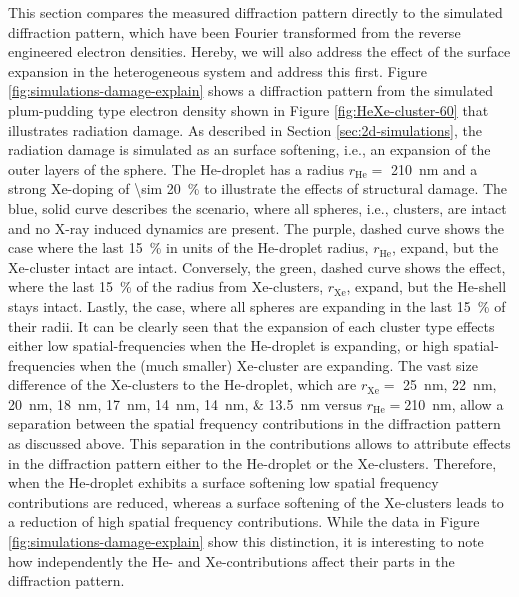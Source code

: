 This section compares the measured diffraction pattern directly to the simulated diffraction pattern, which have been Fourier transformed from the reverse engineered electron densities. Hereby, we will also address the effect of the surface expansion in the heterogeneous system and address this first. Figure \ref{fig:simulations-damage-explain} shows a diffraction pattern from the simulated plum-pudding type electron density shown in Figure \ref{fig:HeXe-cluster-60} that illustrates radiation damage. As described in Section \ref{sec:2d-simulations}, the radiation damage is simulated as an surface softening, i.e., an expansion of the outer layers of the sphere. The He-droplet has a radius $r_{\text{He}}=$ \SI{210}{\nano\meter} and a strong Xe-doping of \SI{\sim 20}{\percent} to illustrate the effects of structural damage. The blue, solid curve describes the scenario, where all spheres, i.e., clusters, are intact and no X-ray induced dynamics are present. The purple, dashed curve shows the case where the last \SI{15}{\percent} in units of the He-droplet radius, $r_{\text{He}}$, expand, but the Xe-cluster intact are intact. Conversely, the green, dashed curve shows the effect, where the last \SI{15}{\percent} of the radius from Xe-clusters, $r_{\text{Xe}}$, expand, but the He-shell stays intact. Lastly, the case, where all spheres are expanding in the last \SI{15}{\percent} of their radii. It can be clearly seen that the expansion of each cluster type effects either low spatial-frequencies when the He-droplet is expanding, or high spatial-frequencies when the (much smaller) Xe-cluster are expanding. The vast size difference of the Xe-clusters to the He-droplet, which are $r_{\text{Xe}}=$ \SIlist{25;22;20;18;17;14;14;13.5}{\nano\meter} versus $r_{\text{He}}=$\SI{210}{\nano\meter}, allow a separation between the spatial frequency contributions in the diffraction pattern as discussed above. This separation in the contributions allows to attribute effects in the diffraction pattern either to the He-droplet or the Xe-clusters. Therefore, when the He-droplet exhibits a surface softening low spatial frequency contributions are reduced, whereas a surface softening of the Xe-clusters leads to a reduction of high spatial frequency contributions. While the data in Figure \ref{fig:simulations-damage-explain} show this distinction, it is interesting to note how independently the He- and Xe-contributions affect their parts in the diffraction pattern.\\[1\baselineskip]
